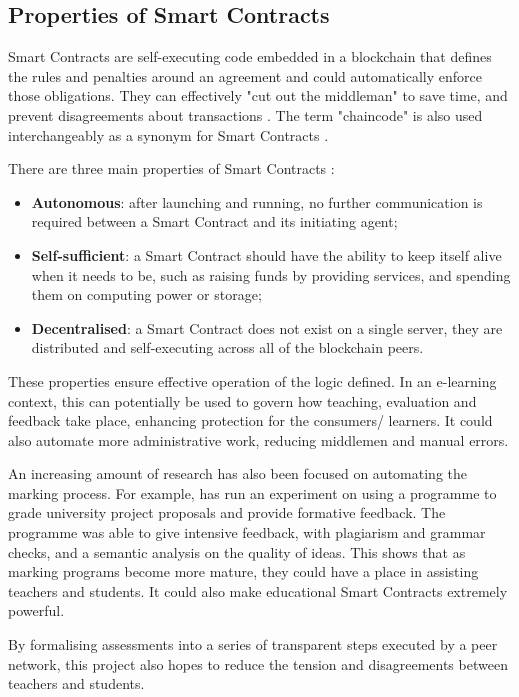 \subsection{Properties of Smart Contracts}
Smart Contracts are self-executing code embedded in a blockchain that defines the rules and penalties around an agreement and
could automatically enforce those obligations. They can effectively "cut out the middleman" to save time, and prevent disagreements
about transactions \citep{gulhane2017ibm}. The term "chaincode" is also used interchangeably as a synonym for
Smart Contracts \citep[p.6]{valenta2017comparison}.

There are three main properties of Smart Contracts \citep[p.16]{swan2015blockchain}:

\begin{itemize}
	\setlength\itemsep{0em}
	\item \textbf{Autonomous}: after launching and running, no further communication is required between a Smart Contract
	      and its initiating agent;
	\item \textbf{Self-sufficient}: a Smart Contract should have the ability to keep itself alive when it needs to be,
	      such as raising funds by providing services, and spending them on computing power or storage;
	\item \textbf{Decentralised}: a Smart Contract does not exist on a single server, they are distributed and self-executing
	      across all of the blockchain peers.
\end{itemize}

These properties ensure effective operation of the logic defined. In an e-learning context, this can potentially
be used to govern how teaching, evaluation and feedback take place, enhancing protection for the consumers/ learners. 
It could also automate more administrative work, reducing middlemen and manual errors.

An increasing amount of research has also been focused on automating the marking process. For example, \citet{al2012auto} has run 
an experiment on using a programme to grade university project proposals and provide formative feedback. The programme was 
able to give intensive feedback, with plagiarism and grammar checks, and a semantic analysis on the quality of ideas.
This shows that as marking programs become more mature, they could have a place in assisting teachers and students. 
It could also make educational Smart Contracts extremely powerful.

By formalising assessments into a series of transparent steps executed by a peer network, this project also hopes to 
reduce the tension and disagreements between teachers and students.

